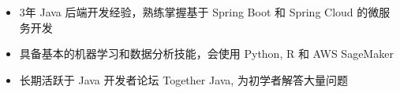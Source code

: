 \begin{itemize}
    \item 3年 Java 后端开发经验，熟练掌握基于 Spring Boot 和 Spring Cloud 的微服务开发 
    \item 具备基本的机器学习和数据分析技能，会使用 Python, R 和 AWS SageMaker 
    \item 长期活跃于 Java 开发者论坛 Together Java, 为初学者解答大量问题
\end{itemize}

